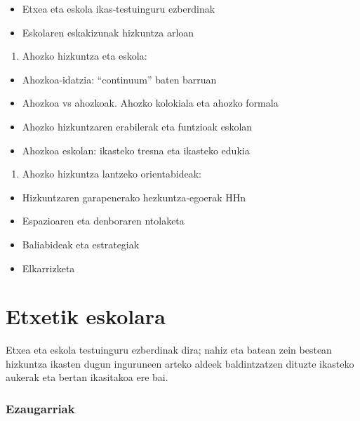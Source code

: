 \documentclass[
]{book}
\providecommand{\tightlist}{%
  \setlength{\itemsep}{0pt}\setlength{\parskip}{0pt}}
\begin{document}
\begin{itemize}
\tightlist
\item
  Etxea eta eskola ikas‐testuinguru ezberdinak
\item
  Eskolaren eskakizunak hizkuntza arloan
\end{itemize}

\begin{enumerate}
\def\labelenumi{\arabic{enumi}.}
\setcounter{enumi}{1}
\tightlist
\item
  Ahozko hizkuntza eta eskola:\\
\end{enumerate}

\begin{itemize}
\tightlist
\item
  Ahozkoa‐idatzia: ``continuum'' baten barruan
\item
  Ahozkoa vs ahozkoak. Ahozko kolokiala eta ahozko formala
\item
  Ahozko hizkuntzaren erabilerak eta funtzioak eskolan
\item
  Ahozkoa eskolan: ikasteko tresna eta ikasteko edukia
\end{itemize}

\begin{enumerate}
\def\labelenumi{\arabic{enumi}.}
\setcounter{enumi}{2}
\tightlist
\item
  Ahozko hizkuntza lantzeko orientabideak:\\
\end{enumerate}

\begin{itemize}
\tightlist
\item
  Hizkuntzaren garapenerako hezkuntza‐egoerak HHn
\item
  Espazioaren eta denboraren ntolaketa
\item
  Baliabideak eta estrategiak
\item
  Elkarrizketa
\end{itemize}

\hypertarget{etxetik-eskolara}{%
\section{Etxetik eskolara}\label{etxetik-eskolara}}

Etxea eta eskola testuinguru ezberdinak dira; nahiz eta batean zein bestean hizkuntza ikasten dugun inguruneen arteko aldeek baldintzatzen dituzte ikasteko aukerak eta bertan ikasitakoa ere bai.

\hypertarget{ezaugarriak}{%
\subsubsection{Ezaugarriak}\label{ezaugarriak}}
\end{document}
